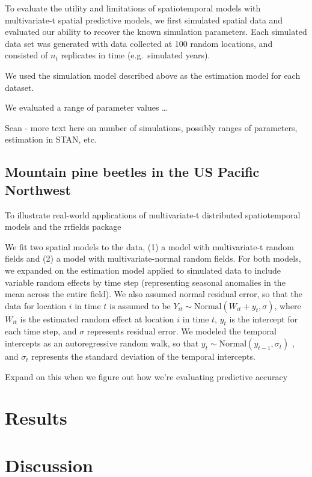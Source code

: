\documentclass[12pt,english]{article}
\begin{document}
\begin{spacing}{1.25}
To evaluate the utility and limitations of spatiotemporal models with
multivariate-t spatial predictive models, we first simulated spatial data and
evaluated our ability to recover the known simulation parameters. Each
simulated data set was generated with data collected at 
100 random locations, and consisted of
$n_t$ replicates in time (e.g.~simulated years). 

We used the simulation model described above as the estimation model for each
dataset.

We evaluated a range of parameter values \ldots

Sean - more text here on number of simulations, possibly ranges of
parameters, estimation in STAN, etc.

\subsection{Mountain pine beetles in the US Pacific Northwest}

To illustrate real-world applications of multivariate-t distributed
spatiotemporal models and the rrfields package

We fit two spatial models to the data, (1) a model with
multivariate-t random fields and (2) a model with multivariate-normal random
fields. For both models, we expanded on the estimation model applied to
simulated data to include variable random effects by time step (representing
seasonal anomalies in the mean across the entire field). We also assumed normal
residual error, so that the data for location $i$ in time $t$ is
assumed to be 
$Y_{it}\sim \mathrm{Normal}\left(W_{it}+y_t, \sigma \right)$, 
where $W_{it}$ is the estimated random effect
at location $i$ in time $t$, $y_t$ is the intercept for each time
step, and $\sigma$ represents residual error. 
We modeled the temporal intercepts as an autoregressive random walk, 
so that 
$y_t\sim \mathrm{Normal}\left( y_{t-1},\sigma_t \right)$ , and
$\sigma_t$ represents the standard deviation of the temporal intercepts.

Expand on this when we figure out how we're evaluating predictive accuracy

\section{Results}

\section{Discussion}


\end{spacing}
\end{document}
